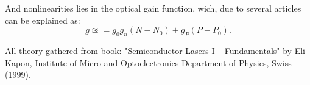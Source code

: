 And nonlinearities lies in the optical gain function, wich, due to several articles can be explained as:
\begin{equation}
	g \approxeq = g_0 g_n(N-N_0) + g_P(P- P_0).
\end{equation}

All theory gathered from book: "Semiconductor Lasers I -- Fundamentals" by Eli Kapon, Institute of Micro and Optoelectronics Department of Physics, Swiss (1999).
